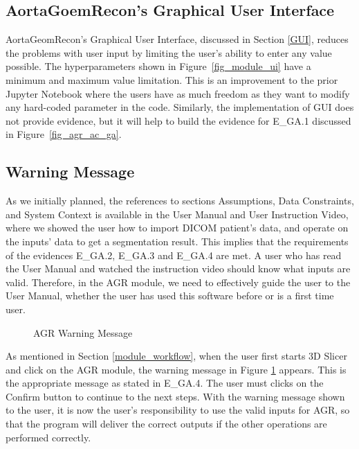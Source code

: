 \subsection{AortaGoemRecon's Graphical User Interface}

AortaGeomRecon's Graphical User Interface, discussed in Section \ref{GUI}, reduces the problems with user input by limiting the user's ability to enter any value possible. The hyperparameters shown in Figure~\ref{fig_module_ui} have a minimum and maximum value limitation. This is an improvement to the prior Jupyter Notebook where the users have as much freedom as they want to modify any hard-coded parameter in the code. Similarly, the implementation of GUI does not provide evidence, but it will help to build the evidence for E\_GA.1 discussed in Figure~\ref{fig_agr_ac_ga}.

\subsection{Warning Message}

As we initially planned, the references to sections Assumptions, Data Constraints, and System Context is available in the User Manual and User Instruction Video, where we showed the user how to import DICOM patient's data, and operate on the inputs' data to get a segmentation result. This implies that the requirements of  the evidences E\_GA.2, E\_GA.3 and E\_GA.4 are met. A user who has read the User Manual and watched the instruction video should know what inputs are valid. Therefore, in the AGR module, we need to effectively guide the user to the User Manual, whether the user has used this software before or is a first time user.

\begin{figure}[H]
    \centering
    \caption[AGR Warning Message]{AGR Warning Message}
    \label{fig_agr_ac_wm}
\end{figure}

As mentioned in Section \ref{module_workflow}, when the user first starts 3D Slicer and click on the AGR module, the warning message in Figure \ref{fig_agr_ac_wm} appears. This is  the appropriate message as stated in E\_GA.4. The user must clicks on the Confirm button to continue to the next steps. With the warning message shown to the user, it is now the user's responsibility to use the valid inputs for AGR, so that the program will deliver the correct outputs if the other operations are performed correctly. 